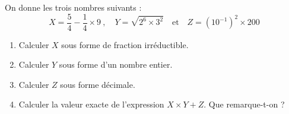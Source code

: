 \begin{exo}{}
	On donne les trois nombres suivants :
	\[ X = \frac{5}{4} - \frac{1}{4} \times 9 \ ,\quad Y = \sqrt{2^6 \times 3^2} \quad\text{et}\quad Z = \left(10^{-1}\right)^2 \times 200 \]
	\begin{enumerate}
		\item Calculer $X$ sous forme de fraction irréductible.
		\item Calculer $Y$ sous forme d'un nombre entier.
		\item Calculer $Z$ sous forme décimale.
		\item Calculer la valeur exacte de l'expression $X \times Y + Z$. Que remarque-t-on ?
	\end{enumerate}
\end{exo}
